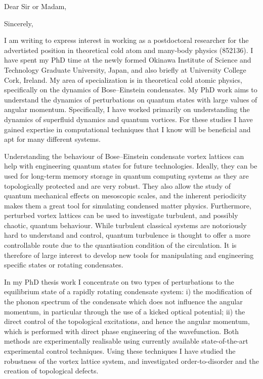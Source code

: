 \documentclass[12pt,a4paper,unicode]{moderncv}
\begin{document}
    \date{\today} %
    \opening{Dear Sir or Madam,}
    \closing{Sincerely,}
    \makelettertitle
{
    I am writing to express interest in working as a postdoctoral researcher for the advertisted position in theoretical cold atom and many-body physics (852136). I have spent my PhD time at the newly formed Okinawa Institute of Science and Technology Graduate University, Japan, and also briefly at University College Cork, Ireland. My area of specialization is in theoretical cold atomic physics, specifically on the dynamics of Bose--Einstein condensates. My PhD work aims to understand the dynamics of perturbations on quantum states with large values of angular momentum. Specifically, I have worked primarily on understanding the dynamics of superfluid dynamics and quantum vortices. For these studies I have gained expertise in computational techniques that I know will be beneficial and apt for many different systems.

    Understanding the behaviour of Bose--Einstein condensate vortex lattices can help with engineering quantum states for future technologies. Ideally, they can be used for long-term memory storage in quantum computing systems as they are topologically protected and are very robust. They also allow the study of quantum mechanical effects on mesoscopic scales, and the inherent periodicity makes them a great tool for simulating condensed matter physics. Furthermore, perturbed vortex lattices can be used to investigate turbulent, and possibly chaotic, quantum behaviour. While turbulent classical systems are notoriously hard to understand and control, quantum turbulence is thought to offer a more controllable route due to the quantisation condition of the circulation. It is therefore of large interest to develop new tools for manipulating and engineering specific states or rotating condensates.

    In my PhD thesis work I concentrate on two types of perturbations to the equilibrium state of a rapidly rotating condensate system: i) the modification of the phonon spectrum of the condensate which does not influence the angular momentum, in particular through the use of a kicked optical potential; ii) the direct control of the topological excitations, and hence the angular momentum, which is performed with direct phase engineering of the wavefunction. Both methods are experimentally realisable using currently available state-of-the-art experimental control techniques. Using these techniques I have studied the robustness of the vortex lattice system, and investigated order-to-disorder and the creation of topological defects.

}
\end{document}
